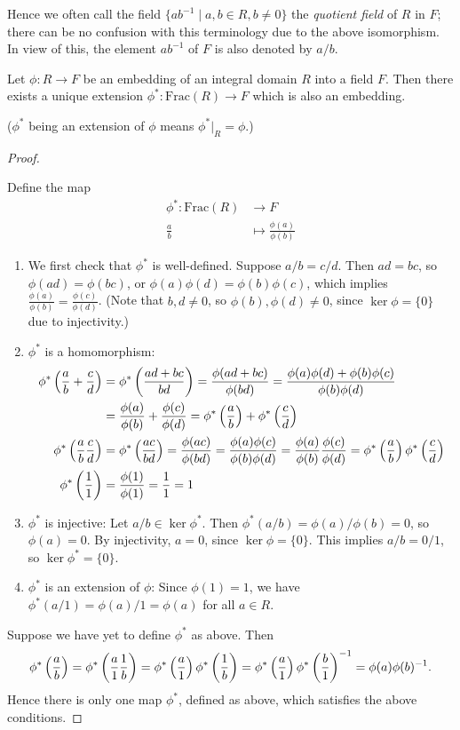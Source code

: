 Hence we often call the field $\{ab^{-1}\mid a,b\in R, b\neq0\}$ the \emph{quotient field} of $R$ in $F$; there can be no confusion with this terminology due to the above isomorphism. In view of this, the element $ab^{-1}$ of $F$ is also denoted by $a/b$. 

\begin{proposition}
Let $\phi\colon R\to F$ be an embedding of an integral domain $R$ into a field $F$. 
Then there exists a unique extension $\phi^*\colon\mathrm{Frac}(R)\to F$ which is also an embedding.

($\phi^*$ being an extension of $\phi$ means $\phi^*|_{R}=\phi$.)
\end{proposition}

\begin{proof} \

 Define the map
\begin{align*}
\phi^*\colon\mathrm{Frac}(R)&\to F\\
\frac{a}{b}&\mapsto\frac{\phi(a)}{\phi(b)}
\end{align*}
\begin{enumerate}
\item We first check that $\phi^*$ is well-defined. 
Suppose $a/b=c/d$. Then $ad=bc$, so $\phi(ad)=\phi(bc)$, or $\phi(a)\phi(d)=\phi(b)\phi(c)$, which implies $\frac{\phi(a)}{\phi(b)}=\frac{\phi(c)}{\phi(d)}$. (Note that $b,d\neq0$, so $\phi(b),\phi(d)\neq0$, since $\ker\phi=\{0\}$ due to injectivity.)

\item $\phi^*$ is a homomorphism:
\begin{align*}
\phi^*\left(\frac{a}{b}+\frac{c}{d}\right)&=\phi^*\left(\frac{ad+bc}{bd}\right)=\frac{\phi(ad+bc)}{\phi(bd)}=\frac{\phi(a)\phi(d)+\phi(b)\phi(c)}{\phi(b)\phi(d)}\\
&=\frac{\phi(a)}{\phi(b)}+\frac{\phi(c)}{\phi(d)}=\phi^*\left(\frac{a}{b}\right)+\phi^*\left(\frac{c}{d}\right)\\
\phi^*\left(\frac{a}{b}\frac{c}{d}\right)&=\phi^*\left(\frac{ac}{bd}\right)=\frac{\phi(ac)}{\phi(bd)}=\frac{\phi(a)\phi(c)}{\phi(b)\phi(d)}=\frac{\phi(a)}{\phi(b)}\frac{\phi(c)}{\phi(d)}=\phi^*\left(\frac{a}{b}\right)\phi^*\left(\frac{c}{d}\right)\\
\phi^*\left(\frac{1}{1}\right)&=\frac{\phi(1)}{\phi(1)}=\frac{1}{1}=1
\end{align*}

\item $\phi^*$ is injective: Let $a/b\in\ker\phi^*$. Then $\phi^*(a/b)=\phi(a)/\phi(b)=0$, so $\phi(a)=0$. By injectivity, $a=0$, since $\ker\phi=\{0\}$. This implies $a/b=0/1$, so $\ker\phi^*=\{0\}$.

\item $\phi^*$ is an extension of $\phi$: Since $\phi(1)=1$, we have $\phi^*(a/1)=\phi(a)/1=\phi(a)$ for all $a\in R$.
\end{enumerate}

Suppose we have yet to define $\phi^*$ as above. Then
\[\phi^*\left(\frac{a}{b}\right)=\phi^*\left(\frac{a}{1}\frac{1}{b}\right)=\phi^*\left(\frac{a}{1}\right)\phi^*\left(\frac{1}{b}\right)=\phi^*\left(\frac{a}{1}\right)\phi^*\left(\frac{b}{1}\right)^{-1}=\phi(a)\phi(b)^{-1}.\]
Hence there is only one map $\phi^*$, defined as above, which satisfies the above conditions.
\end{proof}
